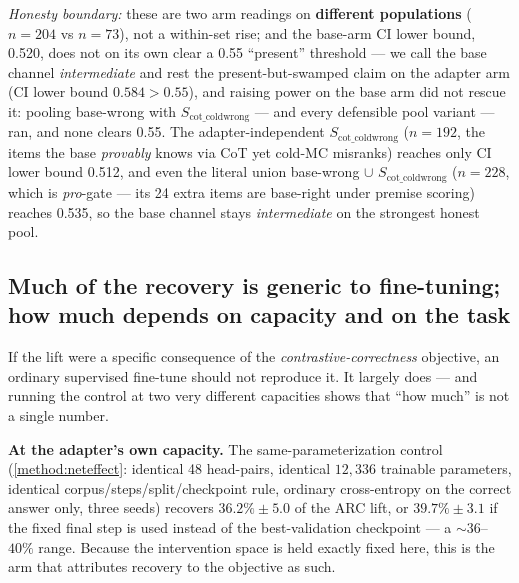 \emph{Honesty boundary:} these are two arm readings on \textbf{different
populations} ($n{=}204$ vs $n{=}73$), not a within-set rise; and the base-arm CI
lower bound, 0.520, does not on its own clear a 0.55 ``present'' threshold --- we
call the base channel \emph{intermediate} and rest the present-but-swamped claim on
the adapter arm (CI lower bound $0.584 > 0.55$), and raising power on the base arm
did not rescue it: pooling base-wrong with $S_{\mathrm{cot\_coldwrong}}$ --- and
every defensible pool variant --- ran, and none clears 0.55. The
adapter-independent $S_{\mathrm{cot\_coldwrong}}$ ($n{=}192$, the items the base
\emph{provably} knows via CoT yet cold-MC misranks) reaches only CI lower bound
0.512, and even the literal union base-wrong ${\cup}$ $S_{\mathrm{cot\_coldwrong}}$
($n{=}228$, which is \emph{pro}-gate --- its 24 extra items are base-right under
premise scoring) reaches 0.535, so the base channel stays \emph{intermediate} on the
strongest honest pool.

\subsection{Much of the recovery is generic to fine-tuning; how much depends on
capacity and on the task}\label{disc:inducibility}

If the lift were a specific consequence of the \emph{contrastive-correctness}
objective, an ordinary supervised fine-tune should not reproduce it. It largely does
--- and running the control at two very different capacities shows that ``how much''
is not a single number.

\textbf{At the adapter's own capacity.} The same-parameterization control
(\cref{method:neteffect}: identical 48 head-pairs, identical $12{,}336$ trainable
parameters, identical corpus/steps/split/checkpoint rule, ordinary cross-entropy on
the correct answer only, three seeds) recovers $\mathbf{36.2\% \pm 5.0}$ of the ARC
lift, or $39.7\% \pm 3.1$ if the fixed final step is used instead of the
best-validation checkpoint --- a ${\sim}36$--$40\%$ range. Because the intervention
space is held exactly fixed here, this is the arm that attributes recovery to the
objective as such.

